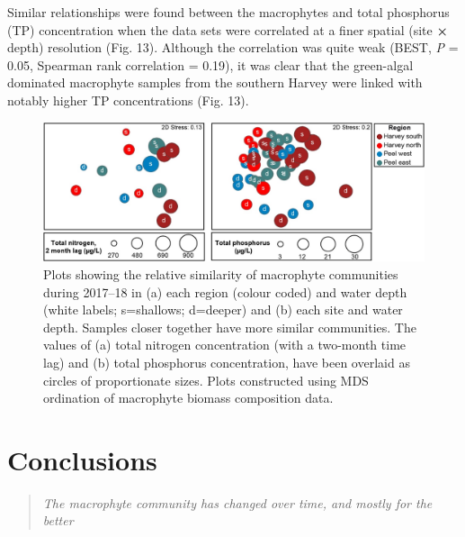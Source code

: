 \documentclass[
]{book}
\begin{document}
Similar relationships were found between the macrophytes and total phosphorus (TP) concentration when the data sets were correlated at a finer spatial (site \textbf{×} depth) resolution (Fig. 13). Although the correlation was quite weak (BEST, \emph{P} = 0.05, Spearman rank correlation = 0.19), it was clear that the green-algal dominated macrophyte samples from the southern Harvey were linked with notably higher TP concentrations (Fig. 13).

\begin{figure}
\includegraphics[width=1\linewidth]{images/macrophytes/picture17} \caption{Plots showing the relative similarity of macrophyte communities during 2017–18 in (a) each region (colour coded) and water depth (white labels; s=shallows; d=deeper) and (b) each site and water depth. Samples closer together have more similar communities. The values of (a) total nitrogen concentration (with a two-month time lag) and (b) total phosphorus concentration, have been overlaid as circles of proportionate sizes. Plots constructed using MDS ordination of macrophyte biomass composition data.}\label{fig:macrophytes-pic17}
\end{figure}

\hypertarget{conclusions-2}{%
\section{Conclusions}\label{conclusions-2}}

\begin{quote}
\emph{The macrophyte community has changed over time, and mostly for the better}
\end{quote}
\end{document}
